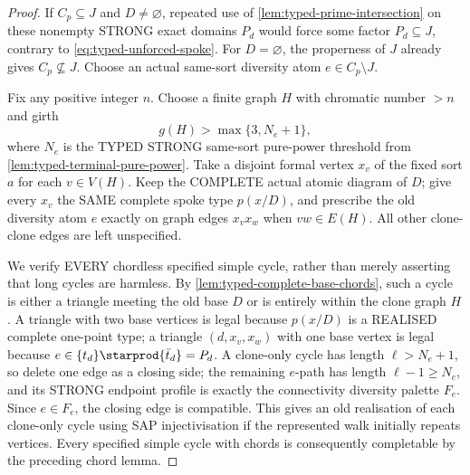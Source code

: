 \begin{proof}
If \(C_p\subseteq J\) and \(D\ne\varnothing\),
repeated use of \cref{lem:typed-prime-intersection}
on these nonempty STRONG exact domains \(P_d\)
would force some factor \(P_d\subseteq J\), contrary
to \eqref{eq:typed-unforced-spoke}.
For \(D=\varnothing\), the properness of \(J\)
already gives \(C_p\not\subseteq J\).
Choose an actual same-sort diversity atom
\(e\in C_p\setminus J\).

Fix any positive integer \(n\). Choose a finite graph
\(H\) with chromatic number \(>n\) and girth
\[
       g(H)>\max\{3,N_e+1\},
\]
where \(N_e\) is the TYPED STRONG same-sort
pure-power threshold from
\cref{lem:typed-terminal-pure-power}.
Take a disjoint formal vertex \(x_v\) of the fixed
sort \(a\) for each \(v\in V(H)\).
Keep the COMPLETE actual atomic diagram of \(D\);
give every \(x_v\) the SAME complete spoke type
\(p(x/D)\), and prescribe the old diversity
atom \(e\) exactly on graph edges \(x_vx_w\)
when \(vw\in E(H)\). All other clone-clone
edges are left unspecified.

We verify EVERY chordless specified simple cycle,
rather than merely asserting that long cycles are
harmless. By
\cref{lem:typed-complete-base-chords}, such a cycle
is either a triangle meeting the old base \(D\)
or is entirely within the clone graph \(H\).
A triangle with two base vertices is legal
because \(p(x/D)\) is a REALISED complete one-point
type; a triangle \((d,x_v,x_w)\) with one base
vertex is legal because
\(e\in \{t_d\}\starprod\{\bar t_d\}=P_d\).
A clone-only cycle has length
\(\ell>N_e+1\), so delete one edge as a
closing side; the remaining \(e\)-path
has length \(\ell-1\ge N_e\), and its
STRONG endpoint profile is exactly the
connectivity diversity palette \(F_e\).
Since \(e\in F_e\), the closing edge is
compatible. This gives an old realisation
of each clone-only cycle using SAP
injectivisation if the represented walk
initially repeats vertices. Every specified
simple cycle with chords is consequently
completable by the preceding chord lemma.


\end{proof}
